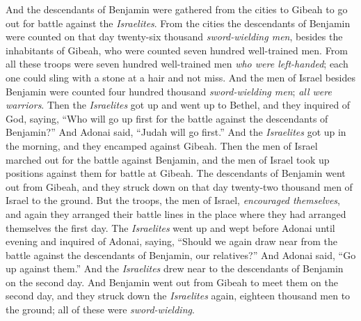 \begin{biblechapter}
\verse And the descendants of Benjamin were gathered from the cities to Gibeah to go out for battle against the \textit{Israelites}.
\verse From the cities the descendants of Benjamin were counted on that day twenty-six thousand \textit{sword-wielding men}, besides the inhabitants of Gibeah, who were counted seven hundred well-trained men.
\verse From all these troops were seven hundred well-trained men \textit{who were left-handed}; each one could sling with a stone at a hair and not miss.
\verse And the men of Israel besides Benjamin were counted four hundred thousand \textit{sword-wielding men}; \textit{all were warriors}.
\verse Then the \textit{Israelites} got up and went up to Bethel, and they inquired of God, saying, “Who will go up first for the battle against the descendants of Benjamin?” And Adonai said, “Judah will go first.”
\verse And the \textit{Israelites} got up in the morning, and they encamped against Gibeah.
\verse Then the men of Israel marched out for the battle against Benjamin, and the men of Israel took up positions against them for battle at Gibeah.
\verse The descendants of Benjamin went out from Gibeah, and they struck down on that day twenty-two thousand men of Israel to the ground.
\verse But the troops, the men of Israel, \textit{encouraged themselves}, and again they arranged their battle lines in the place where they had arranged themselves the first day.
\verse The \textit{Israelites} went up and wept before Adonai until evening and inquired of Adonai, saying, “Should we again draw near from the battle against the descendants of Benjamin, our relatives?” And Adonai said, “Go up against them.”
\verse And the \textit{Israelites} drew near to the descendants of Benjamin on the second day.
\verse And Benjamin went out from Gibeah to meet them on the second day, and they struck down the \textit{Israelites} again, eighteen thousand men to the ground; all of these were \textit{sword-wielding}.

\end{biblechapter}
